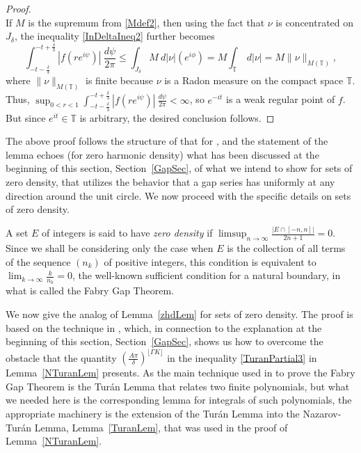 \documentclass[11pt,a4paper]{article}
\newcommand{\T}{\mathbb{T}}
\def\klim{{\displaystyle\lim_{k\rightarrow\infty}}}
\begin{document}
\begin{proof}
\begin{equation}
\end{equation}
If $M$ is the supremum from \eqref{Mdef2}, then using the fact that $\nu$ is concentrated on $J_\delta$, the inequality \eqref{InDeltaIneq2} further becomes
\[
\int_{-t-\frac{\delta}{3}}^{-t+\frac{\delta}{3}}|f(re^{i\psi})|\ \frac{d\psi}{2\pi} \le \int_{J_\delta} M\  d|\nu|(e^{i\phi})=M\int_\T\  d|\nu|=M\|\nu\|_{M(\T)},
\]
where $\|\nu\|_{M(\T)}$ is finite because $\nu$ is a Radon measure on the compact space $\T$. Thus, $\sup_{0<r<1}\int_{-t-\frac{\delta}{3}}^{-t+\frac{\delta}{3}}|f(re^{i\psi})|\ \frac{d\psi}{2\pi}<\infty$, so $e^{-it}$ is a weak regular point of $f$. But since $e^{it}\in\T$ is arbitrary, the desired conclusion follows.
\end{proof}

The above proof follows the structure of that for \cite[Proposition~10.4.7]{gra13}, and the statement of the lemma echoes (for zero harmonic density) what has been discussed at the beginning of this section, Section~\ref{GapSec}, of what we intend to show for sets of zero density, that utilizes the behavior that a gap series has uniformly at any direction around the unit circle. We now proceed with the specific details on sets of zero density.

A set $E$ of integers is said to have \emph{zero density} if ${\displaystyle\limsup_{n\rightarrow\infty}}\frac{|E\cap[-n,n]|}{2n+1}=0$. Since we shall be considering only the case when $E$ is the collection of all terms of the sequence $(n_k)$ of positive integers, this condition is equivalent to $\klim\frac{k}{n_k}=0$, the well-known sufficient condition for a natural boundary, in what is called the Fabry Gap Theorem.

We now give the analog of Lemma~\ref{zhdLem} for sets of zero density. The proof is based on the technique in \cite[Section~5.3]{mon94}, which, in connection to the explanation at the beginning of this section, Section~\ref{GapSec}, shows us how to overcome the obstacle that the quantity $\left(\frac{A\pi}{\delta}\right)^{\lfloor\Gamma K\rfloor}$ in the inequality \eqref{TuranPartial3} in Lemma~\ref{NTuranLem} presents. As the main technique used in \cite[Section~5.3]{mon94} to prove the Fabry Gap Theorem is the Tur\'an Lemma that relates two finite polynomials, but what we needed here is the corresponding lemma for integrals of such polynomials, the appropriate machinery is the extension of the Tur\'an Lemma into the Nazarov-Tur\'an Lemma, Lemma~\ref{TuranLem}, that was used in the proof of Lemma~\ref{NTuranLem}.
\end{document}
